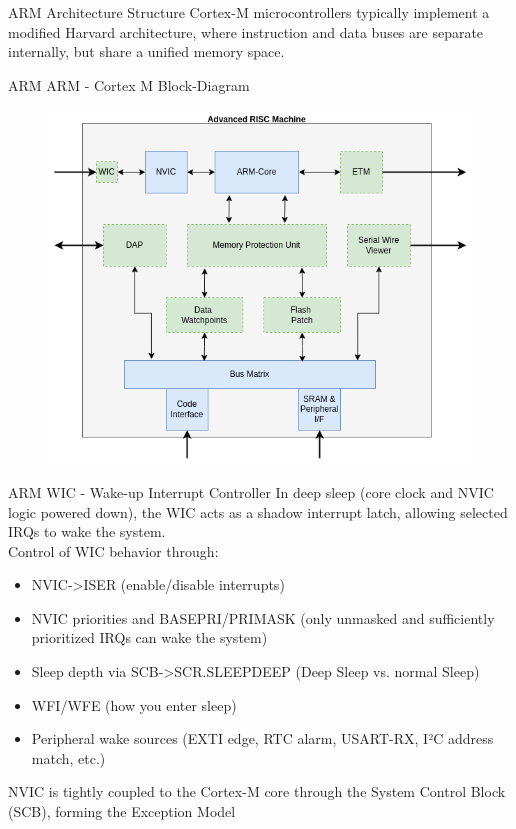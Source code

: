 \documentclass{beamer}
\begin{document}
\begin{frame}{ARM}
	{Architecture Structure}
	Cortex-M microcontrollers typically implement a modified Harvard architecture, where instruction and data buses are separate internally, but share a unified memory space.
\end{frame}
\begin{frame}{ARM}
	{ARM - Cortex M Block-Diagram}
	\begin{figure}
		\includegraphics[width=.8\linewidth]{ARM_Block_Diagram.png}
	\end{figure}
\end{frame}
\begin{frame}{ARM}
	{WIC - Wake-up Interrupt Controller}
	In deep sleep (core clock and NVIC logic powered down), the WIC acts as a shadow interrupt latch, allowing selected IRQs to wake the system.\\
	\vspace{0.2cm}
	Control of WIC behavior through:
	\begin{itemize}
		\item NVIC->ISER (enable/disable interrupts)
		\item NVIC priorities and BASEPRI/PRIMASK (only unmasked and sufficiently prioritized IRQs can wake the system)
		\item Sleep depth via SCB->SCR.SLEEPDEEP (Deep Sleep vs. normal Sleep)
		\item WFI/WFE (how you enter sleep)
		\item Peripheral wake sources (EXTI edge, RTC alarm, USART-RX, I²C address match, etc.)
	\end{itemize}
	NVIC is tightly coupled to the Cortex-M core through the System Control Block (SCB), forming the Exception Model
\end{frame}
\end{document}
